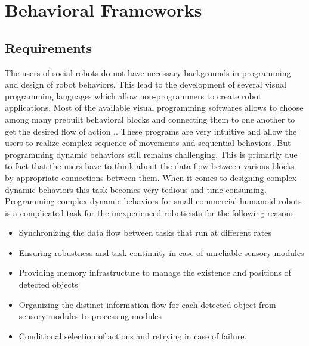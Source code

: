 
\chapter{Behavioral Frameworks} %

\label{Chapter5} %


\section{Requirements}
The users of social robots do not have necessary backgrounds in programming and design of robot behaviors. This lead to the development of several visual programming languages which allow non-programmers to create robot applications. Most of the available visual programming softwares allows to choose among many prebuilt behavioral blocks and connecting them to one another to get the desired flow of action \cite{MSRS4},\cite{Choregraphe}. These programs are very intuitive and allow the users to realize complex sequence of movements and sequential behaviors. But programming dynamic behaviors still remains challenging. This is primarily due to fact that the users have to think about the data flow between various blocks by appropriate connections between them. When it comes to designing complex dynamic behaviors this task becomes very tedious and time consuming. 
Programming complex dynamic behaviors for small commercial humanoid robots is a complicated task for the inexperienced roboticists\cite{BerenzTDM2014} for the following reasons.
\begin{itemize}
\item Synchronizing the data flow between tasks that run at different rates
\item Ensuring robustness and task continuity in case of unreliable sensory modules
\item Providing memory infrastructure to manage the existence and positions of detected objects
\item Organizing the distinct information flow for each detected object from sensory modules to processing modules
\item Conditional selection of actions and retrying in case of failure. 
\end{itemize}
